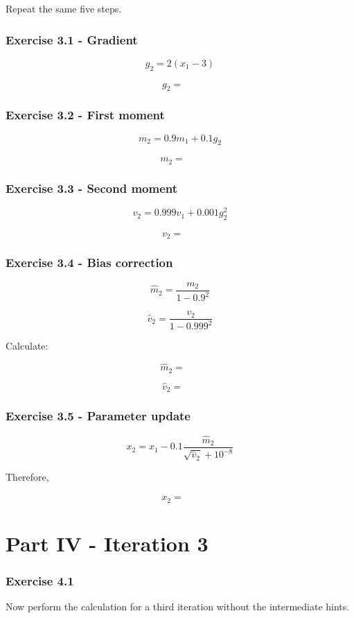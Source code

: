 \documentclass{course_sheet}
\begin{document}
Repeat the same five steps.

\subsubsection*{Exercise 3.1 - Gradient}
\[
g_2 = 2(x_1-3)
\]

\[
g_2 = {\phantom{000}}
\]

\subsubsection*{Exercise 3.2 - First moment}
\[
m_2 = 0.9m_1+0.1g_2
\]

\[
m_2 = {\phantom{000}}
\]

\subsubsection*{Exercise 3.3 - Second moment}
\[
v_2 = 0.999v_1+0.001g_2^2
\]

\[
v_2 = {\phantom{000}}
\]

\subsubsection*{Exercise 3.4 - Bias correction}
\[
\hat m_2 =
\frac{m_2}{1-0.9^2}
\]

\[
\hat v_2 =
\frac{v_2}{1-0.999^2}
\]

Calculate:

\[
\hat m_2 = {\phantom{000}}
\]

\[
\hat v_2 = {\phantom{000}}
\]

\subsubsection*{Exercise 3.5 - Parameter update}
\[
x_2 =
x_1 -
0.1
\frac{\hat m_2}
{\sqrt{\hat v_2}+10^{-8}}
\]

Therefore,

\[
x_2 = {\phantom{000}}
\]

\clearpage
\section*{Part IV - Iteration 3}
\subsubsection*{Exercise 4.1}
Now perform the calculation for a third iteration without the intermediate hints.
\end{document}
